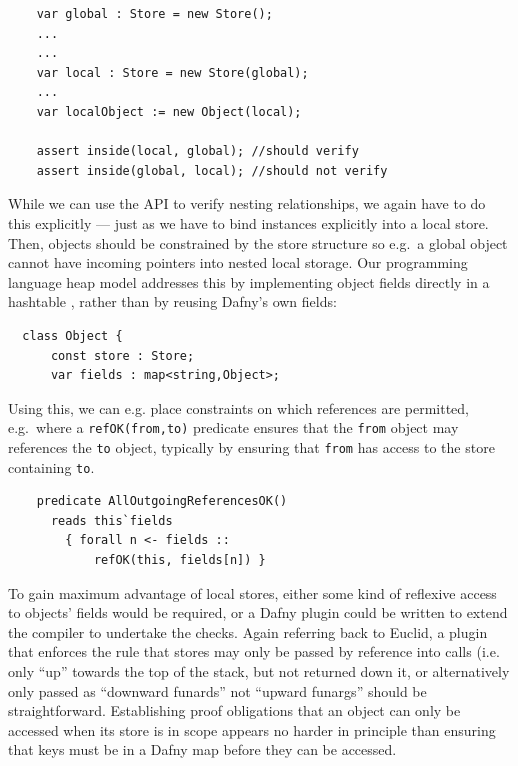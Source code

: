 \begin{lstlisting}
    var global : Store = new Store();
    ...
    ...
    var local : Store = new Store(global);
    ...
    var localObject := new Object(local);

    assert inside(local, global); //should verify
    assert inside(global, local); //should not verify
\end{lstlisting}

While we can use the API to verify nesting relationships, we again
have to do this explicitly --- just as we have to bind instances
explicitly into a local store.  Then, objects should be constrained by
the store structure so e.g.\ a global object cannot have incoming
pointers into nested local storage.  Our programming language heap
model addresses this by implementing object fields directly in a
hashtable \cite{dafnydala-ftfjp2024}, rather than by reusing Dafny's
own fields:
\pagebreak[3]

\begin{lstlisting}
  class Object {  
      const store : Store;
      var fields : map<string,Object>;  
\end{lstlisting}

Using this, we can e.g. place constraints on which references are
permitted, e.g.\ where a \lstinline+refOK(from,to)+ predicate
ensures that the \lstinline+from+ object may references the
\lstinline+to+ object, typically by ensuring that \lstinline+from+ has
access to the store containing \lstinline+to+.

\begin{lstlisting}
    predicate AllOutgoingReferencesOK()
      reads this`fields
        { forall n <- fields ::
            refOK(this, fields[n]) }
\end{lstlisting}

To gain maximum advantage of local stores, either some kind of
reflexive access to objects' fields would be required, or a Dafny
plugin could be written to extend the compiler to undertake the
checks. Again referring back to Euclid, a plugin that enforces
the rule that stores may only be passed by reference into calls
(i.e. only ``up'' towards the top of the stack, but not returned down
it,
or alternatively only passed as ``downward funards'' not ``upward
funargs'' \cite{funarg-sigsam1970,scheme-hosc1998} should be 
straightforward. Establishing proof obligations that an object can
only be accessed when its store is in scope appears no harder in
principle than ensuring that keys must be in a Dafny map before they
can be accessed.
 

